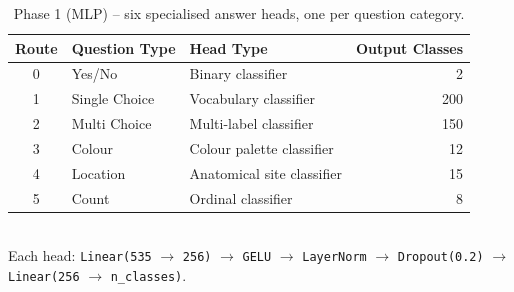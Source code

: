 \begin{table}[H]
\centering
\caption{Phase 1 (MLP) -- six specialised answer heads, one per question category.}
\label{tab:p1_heads}
\begin{tabular}{cllr}
\toprule
\textbf{Route} & \textbf{Question Type} & \textbf{Head Type} & \textbf{Output Classes} \\
\midrule
0 & Yes/No & Binary classifier & 2 \\
1 & Single Choice & Vocabulary classifier & 200 \\
2 & Multi Choice & Multi-label classifier & 150 \\
3 & Colour & Colour palette classifier & 12 \\
4 & Location & Anatomical site classifier & 15 \\
5 & Count & Ordinal classifier & 8 \\
\bottomrule
\end{tabular}
\\[0.4em]
{\footnotesize Each head: \texttt{Linear(535} $\to$ \texttt{256)} $\to$ \texttt{GELU} $\to$
\texttt{LayerNorm} $\to$ \texttt{Dropout(0.2)} $\to$ \texttt{Linear(256} $\to$
\texttt{n\_classes)}.}
\end{table}
